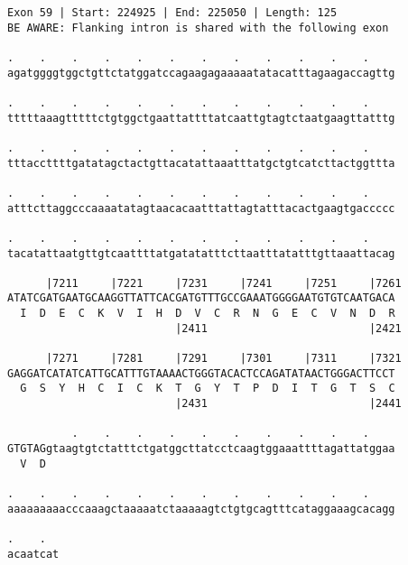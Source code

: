 \documentclass{article}
\begin{document}
\newpage
\begin{Verbatim}[fontfamily=courier]
Exon 59 | Start: 224925 | End: 225050 | Length: 125
BE AWARE: Flanking intron is shared with the following exon

.    .    .    .    .    .    .    .    .    .    .    .    
agatggggtggctgttctatggatccagaagagaaaaatatacatttagaagaccagttg

.    .    .    .    .    .    .    .    .    .    .    .    
tttttaaagtttttctgtggctgaattattttatcaattgtagtctaatgaagttatttg

.    .    .    .    .    .    .    .    .    .    .    .    
tttaccttttgatatagctactgttacatattaaatttatgctgtcatcttactggttta

.    .    .    .    .    .    .    .    .    .    .    .    
atttcttaggcccaaaatatagtaacacaatttattagtatttacactgaagtgaccccc

.    .    .    .    .    .    .    .    .    .    .    .    
tacatattaatgttgtcaattttatgatatatttcttaatttatatttgttaaattacag

      |7211     |7221     |7231     |7241     |7251     |7261
ATATCGATGAATGCAAGGTTATTCACGATGTTTGCCGAAATGGGGAATGTGTCAATGACA
  I  D  E  C  K  V  I  H  D  V  C  R  N  G  E  C  V  N  D  R
                          |2411                         |2421

      |7271     |7281     |7291     |7301     |7311     |7321
GAGGATCATATCATTGCATTTGTAAAACTGGGTACACTCCAGATATAACTGGGACTTCCT
  G  S  Y  H  C  I  C  K  T  G  Y  T  P  D  I  T  G  T  S  C
                          |2431                         |2441

          .    .    .    .    .    .    .    .    .    .    
GTGTAGgtaagtgtctatttctgatggcttatcctcaagtggaaattttagattatggaa
  V  D                                                      

.    .    .    .    .    .    .    .    .    .    .    .    
aaaaaaaaacccaaagctaaaaatctaaaaagtctgtgcagtttcataggaaagcacagg

.    .  
acaatcat
\end{Verbatim}
\newpage
\end{document}
